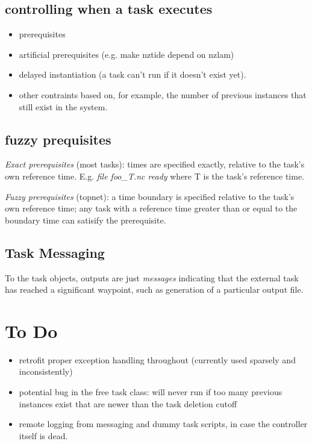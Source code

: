 \documentclass[11pt,a4paper]{article}
\begin{document}
\subsection{controlling when a task executes}

\begin{itemize}
 \item  prerequisites
 \item artificial prerequisites (e.g. make nztide depend on nzlam)
 \item delayed instantiation (a task can't run if it doesn't exist yet).
 \item other contraints based on, for example, the number of previous
 instances that still exist in the system.
\end{itemize}


\subsection{fuzzy prequisites}

{\em Exact prerequisites} (most tasks): times are specified exactly,
relative to the task's own reference time.  E.g. {\em file foo\_{T}.nc
ready} where T is the task's reference time.

{\em Fuzzy prerequisites} (topnet): a time boundary is specified
relative to the task's own reference time; any task with a reference
time greater than or equal to the boundary time can satisify the
prerequisite.

\subsection{Task Messaging}

To the task objects, outputs are just {\em messages} indicating that the
external task has reached a significant waypoint, such as generation of
a particular output file.

\section{To Do}

\begin{itemize}

\item
 retrofit proper exception handling throughout (currently used sparsely and 
  inconsistently)

\item
 potential bug in the free task class: will never run if too many
 previous instances exist that are newer than the task deletion cutoff

\item
 remote logging from messaging and dummy task scripts, in case the
 controller itself is dead.

\end{itemize}
\end{document}
